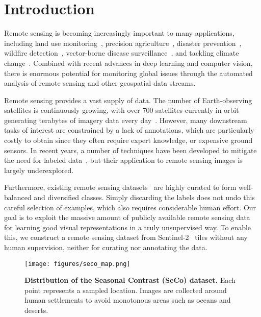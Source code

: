 \documentclass[10pt,twocolumn,letterpaper]{article}
\newcommand{\methodname}[0]{SeCo}
\begin{document}
\section{Introduction}
Remote sensing is becoming increasingly important to many applications, including land use monitoring~\cite{foody2003remote}, precision agriculture~\cite{mulla2013twenty}, disaster prevention~\cite{schumann2018assisting}, wildfire detection~\cite{filipponi2019exploitation}, vector-borne disease surveillance~\cite{ippoliti2019defining}, and tackling climate change~\cite{rolnick2019tackling}. Combined with recent advances in deep learning and computer vision, there is enormous potential for monitoring global issues through the automated analysis of remote sensing and other geospatial data streams.

Remote sensing provides a vast supply of data. The number of Earth-observing satellites is continuously growing, with over 700 satellites currently in orbit generating terabytes of imagery data every day~\cite{neumann2019domain}. However, many downstream tasks of interest are constrained by a lack of annotations, which are particularly costly to obtain since they often require expert knowledge, or expensive ground sensors. In recent years, a number of techniques have been developed to mitigate the need for labeled data~\cite{laradji2020weaklyWS, laradji2020looc, laradji2019masks}, but their application to remote sensing images is largely underexplored.

Furthermore, existing remote sensing datasets~\cite{sumbul2019bigearthnet, helber2019eurosat, uzkent2019learning} are highly curated to form well-balanced and diversified classes. Simply discarding the labels does not undo this careful selection of examples, which also requires considerable human effort. Our goal is to exploit the massive amount of publicly available remote sensing data for learning good visual representations in a truly unsupervised way. To enable this, we construct a remote sensing dataset from Sentinel-2~\cite{drusch2012sentinel} tiles without any human supervision, neither for curating nor annotating the data.

\begin{figure}[t]
    \begin{center}
    \texttt{[image: figures/seco\_map.png]}
    \end{center}
    \caption{\textbf{Distribution of the Seasonal Contrast (\methodname{}) dataset.} Each point represents a sampled location. Images are collected around human settlements to avoid monotonous areas such as oceans and deserts.}
    \label{fig:map}
\end{figure}
\end{document}
